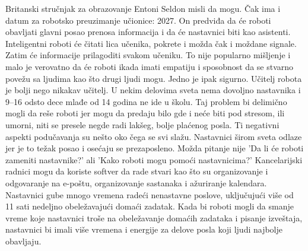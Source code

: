 \documentclass[a4paper]{article}
\begin{document}
Britanski stručnjak za obrazovanje Entoni Seldon misli da mogu. Čak ima i datum za robotsko preuzimanje učionice: 2027. On predviđa da će roboti obavljati glavni posao prenosa informacija i da će nastavnici biti kao asistenti. Inteligentni roboti će čitati lica učenika, pokrete i možda čak i moždane signale. Zatim će informacije prilagoditi svakom učeniku. To nije popularno mišljenje i malo je verovatno da će roboti ikada imati empatiju i sposobnost da se stvarno povežu sa ljudima kao što drugi ljudi mogu.
Jedno je ipak sigurno. Učitelj robota je bolji nego nikakav učitelj. U nekim delovima sveta nema dovoljno nastavnika i 9–16 odsto dece mlađe od 14 godina ne ide u školu. Taj problem bi delimično mogli da reše roboti jer mogu da predaju bilo gde i neće biti pod stresom, ili umorni, niti se presele negde radi lakšeg, bolje plaćenog posla.
Ti negativni aspekti podučavanja su nešto oko čega se svi slažu. Nastavnici širom sveta odlaze jer je to težak posao i osećaju se prezaposleno. Možda pitanje nije 'Da li će roboti zameniti nastavnike?' ali 'Kako roboti mogu pomoći nastavnicima?' Kancelarijski radnici mogu da koriste softver da rade stvari kao što su organizovanje i odgovaranje na e-poštu, organizovanje sastanaka i ažuriranje kalendara. Nastavnici gube mnogo vremena radeći nenastavne poslove, uključujući više od 11 sati nedeljno obeležavajući domaći zadatak. Kada bi roboti mogli da smanje vreme koje nastavnici troše na obeležavanje domaćih zadataka i pisanje izveštaja, nastavnici bi imali više vremena i energije za delove posla koji ljudi najbolje obavljaju.
\end{document}
